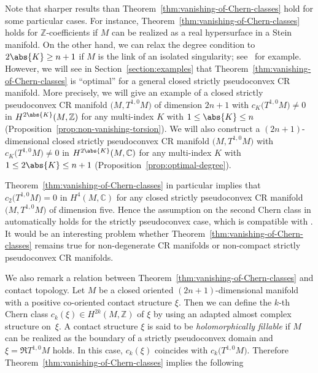 \documentclass[10pt,a4paper]{amsart}
\numberwithin{equation}{section}
\begin{document}
Note that sharper results than Theorem~\ref{thm:vanishing-of-Chern-classes} hold for some particular cases. For instance, Theorem~\ref{thm:vanishing-of-Chern-classes} holds for $\mathbb{Z}$-coefficients if $M$ can be realized as a real hypersurface in a Stein manifold. On the other hand, we can relax the degree condition to $2 \abs{K} \geq n + 1$ if $M$ is the link of an isolated singularity; see~\cite{Kollar13} for example. However, we will see in Section~\ref{section:examples} that Theorem~\ref{thm:vanishing-of-Chern-classes} is ``optimal'' for a general closed strictly pseudoconvex CR manifold. More precisely, we will give an example of a closed strictly pseudoconvex CR manifold $\big(M,T^{1,0} M\big)$ of dimension $2 n + 1$ with $c_{K}\big(T^{1,0}M\big) \neq 0$ in $H^{2 \abs{K}}(M, \mathbb{Z})$ for any multi-index $K$ with $1 \leq \abs{K} \leq n$ (Proposition~\ref{prop:non-vanishing-torsion}). We will also construct a $(2 n + 1)$-dimensional closed strictly pseudoconvex CR manifold $\big(M,T^{1,0} M\big)$ with $c_{K}\big(T^{1,0}M\big) \neq 0$ in $H^{2 \abs{K}}(M, \mathbb{C})$ for any multi-index $K$ with $1 \leq 2\abs{K} \leq n + 1$ (Proposition~\ref{prop:optimal-degree}).

Theorem~\ref{thm:vanishing-of-Chern-classes} in particular implies that $c_{2}\big(T^{1,0}M\big) = 0$ in $H^{4}(M, \mathbb{C})$ for any closed strictly pseudoconvex CR manifold $\big(M,T^{1,0} M\big)$ of dimension five. Hence the assumption on the second Chern class in \cite[Proposition~8.8]{Case-Gover17} automatically holds for the strictly pseudoconvex case, which is compatible with \cite[Theorem~4.6]{Marugame16}. It would be an interesting problem whether Theo\-rem~\ref{thm:vanishing-of-Chern-classes} remains true for non-degenerate CR manifolds or non-compact strictly pseudoconvex CR manifolds.

We also remark a relation between Theorem~\ref{thm:vanishing-of-Chern-classes} and contact topology. Let $M$ be a closed oriented $(2 n + 1)$-dimensional manifold with a positive co-oriented contact structure $\xi$. Then we can define the $k$-th Chern class $c_{k}(\xi) \in H^{2 k}(M, \mathbb{Z})$ of $\xi$ by using an adapted almost complex structure on~$\xi$. A contact structure $\xi$ is said to be \emph{holomorphically fillable} if $M$ can be realized as the boundary of a strictly pseudoconvex domain and $\xi = \Re T^{1, 0} M$ holds. In this case, $c_{k}(\xi)$ coincides with $c_{k}\big(T^{1,0}M\big)$. Therefore Theorem~\ref{thm:vanishing-of-Chern-classes} implies the following
\end{document}
